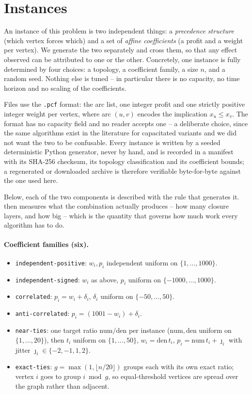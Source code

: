 \documentclass[11pt]{article}
\begin{document}
\section{Instances}\label{sec:instances}

An instance of this problem is two independent things: a \emph{precedence
structure} (which vertex forces which) and a set of \emph{affine
coefficients} (a profit and a weight per vertex). We generate the two
separately and cross them, so that any effect observed can be attributed to
one or the other. Concretely, one instance is fully determined by four
choices: a topology, a coefficient family, a size $n$, and a random seed.
Nothing else is tuned -- in particular there is no capacity, no time horizon
and no scaling of the coefficients.

Files use the \texttt{.pcf} format: the arc list, one integer profit and one
strictly positive integer weight per vertex, where arc $(u,v)$ encodes the
implication $x_u\le x_v$. The format has no capacity field and no reader
accepts one -- a deliberate choice, since the same algorithms exist in the
literature for capacitated variants and we did not want the two to be
confusable. Every instance is written by a seeded deterministic Python
generator, never by hand, and is recorded in a manifest with its SHA-256
checksum, its topology classification and its coefficient bounds; a
regenerated or downloaded archive is therefore verifiable byte-for-byte
against the one used here.

Below, each of the two components is described with the rule that generates
it.  then measures what the combination actually produces
-- how many closure layers, and how big -- which is the quantity that governs
how much work every algorithm has to do.

\paragraph{Coefficient families (six).}
\begin{itemize}
  \item \texttt{independent-positive}: $w_i,p_i$ independent uniform on
  $\{1,\dots,1000\}$.
  \item \texttt{independent-signed}: $w_i$ as above, $p_i$ uniform on
  $\{-1000,\dots,1000\}$.
  \item \texttt{correlated}: $p_i=w_i+\delta_i$, $\delta_i$ uniform on
  $\{-50,\dots,50\}$.
  \item \texttt{anti-correlated}: $p_i=(1001-w_i)+\delta_i$.
  \item \texttt{near-ties}: one target ratio $\mathrm{num}/\mathrm{den}$ per
  instance ($\mathrm{num},\mathrm{den}$ uniform on $\{1,\dots,20\}$), then
  $t_i$ uniform on $\{1,\dots,50\}$, $w_i=\mathrm{den}\,t_i$,
  $p_i=\mathrm{num}\,t_i+\jmath_i$ with jitter $\jmath_i\in\{-2,-1,1,2\}$.
  \item \texttt{exact-ties}: $g=\max(1,\lfloor n/20\rfloor)$ groups each with
  its own exact ratio; vertex $i$ goes to group $i\bmod g$, so equal-threshold
  vertices are spread over the graph rather than adjacent.
\end{itemize}
\end{document}
